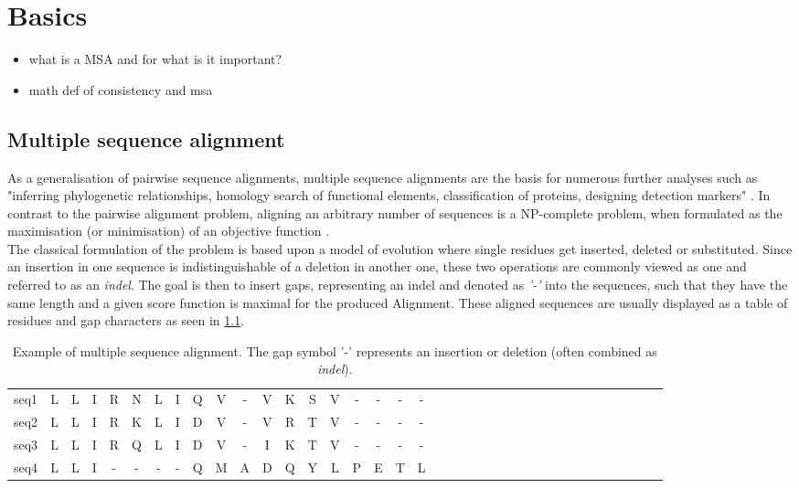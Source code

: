 \chapter{Basics}

\begin{itemize}
	\item what is a MSA and for what is it important?
	\item math def of consistency and msa
\end{itemize}

\section{Multiple sequence alignment}



As a generalisation of pairwise sequence alignments, multiple sequence alignments are the basis for numerous further analyses such as "inferring phylogenetic relationships, homology search of functional elements, classification of proteins, designing detection markers" \cite[pg. 3]{Russell2016}. In contrast to the pairwise alignment problem, aligning an arbitrary number of sequences is a NP-complete problem, when formulated as the maximisation (or minimisation) of an objective function \cite[pg. 172]{Russell2016}.\\
The classical formulation of the problem is based upon a model of evolution where single residues get inserted, deleted or substituted. Since an insertion in one sequence is indistinguishable of a deletion in another one, these two operations are commonly viewed as one and referred to as an \textit{indel}. The goal is then to insert gaps, representing an indel and denoted as \textit{'-'} into the sequences, such that they have the same length and a given score function is maximal for the produced Alignment. These aligned sequences are usually displayed as a table of residues and gap characters as seen in \cref{tab:msa-example}\cite{Russell2016}. 

\begin{table}[h]
\centering
\begin{tabular}{l c c c c c c c c c c c c c c c c c c c c c c c c c c c c c c c c c c c c}
	seq1 & L&L&I&R&N&L&I&Q&V&-&V&K&S&V&-&-&-&- \\
	seq2 & L&L&I&R&K&L&I&D&V&-&V&R&T&V&-&-&-&- \\
	seq3 & L&L&I&R&Q&L&I&D&V&-&I&K&T&V&-&-&-&- \\
	seq4 & L&L&I&-&-&-&-&Q&M&A&D&Q&Y&L&P&E&T&L \\
\end{tabular}
\caption{Example of multiple sequence alignment. The gap symbol '-' represents an insertion or deletion (often combined as \textit{indel}).}
\label{tab:msa-example}
\end{table}


